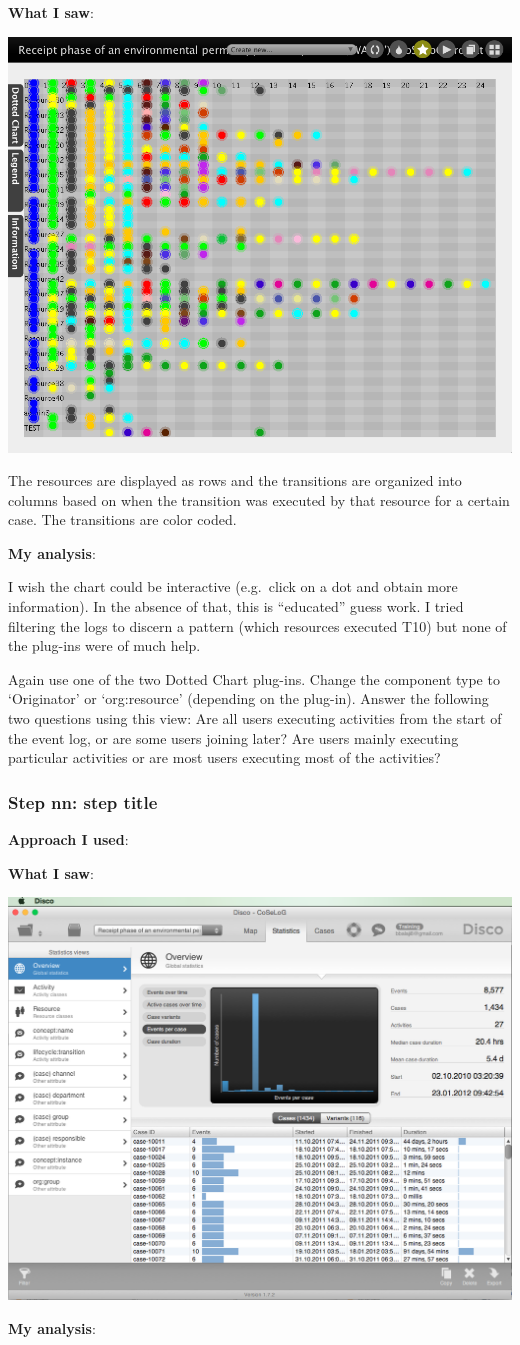\documentclass[]{article}
\begin{document}
\textbf{What I saw}:

\includegraphics{CoSeLoG_Step_07_SocialDots.png}

The resources are displayed as rows and the transitions are organized
into columns based on when the transition was executed by that resource
for a certain case. The transitions are color coded.

\textbf{My analysis}:

I wish the chart could be interactive (e.g.~click on a dot and obtain
more information). In the absence of that, this is ``educated'' guess
work. I tried filtering the logs to discern a pattern (which resources
executed T10) but none of the plug-ins were of much help.

Again use one of the two Dotted Chart plug-ins. Change the component
type to `Originator' or `org:resource' (depending on the plug-in).
Answer the following two questions using this view: Are all users
executing activities from the start of the event log, or are some users
joining later? Are users mainly executing particular activities or are
most users executing most of the activities?

\subsubsection{Step nn: step title}\label{step-nn-step-title}

\textbf{Approach I used}:

\textbf{What I saw}:

\includegraphics{dummy.png}

\textbf{My analysis}:
\end{document}
